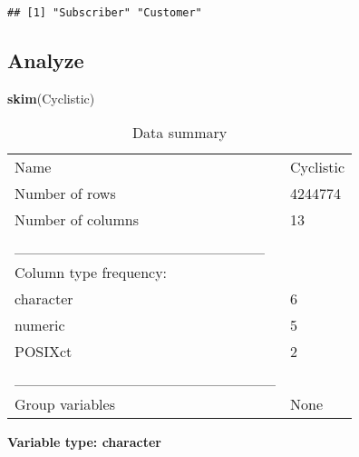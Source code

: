 \documentclass[
]{article}
\newenvironment{Shaded}{\begin{snugshade}}{\end{snugshade}}
\newcommand{\FunctionTok}[1]{\textcolor[rgb]{0.13,0.29,0.53}{\textbf{#1}}}
\newcommand{\NormalTok}[1]{#1}
\newcommand{\SpecialCharTok}[1]{\textcolor[rgb]{0.81,0.36,0.00}{\textbf{#1}}}
\begin{document}
\begin{Shaded}
\end{Shaded}

\begin{verbatim}
## [1] "Subscriber" "Customer"
\end{verbatim}

\hypertarget{analyze}{%
\subsection{Analyze}\label{analyze}}

\begin{Shaded}
\begin{Highlighting}[]
\FunctionTok{skim}\NormalTok{(Cyclistic)}
\end{Highlighting}
\end{Shaded}

\begin{longtable}[]{@{}ll@{}}
\caption{Data summary}\tabularnewline
\toprule\noalign{}
\endfirsthead
\endhead
\bottomrule\noalign{}
\endlastfoot
Name & Cyclistic \\
Number of rows & 4244774 \\
Number of columns & 13 \\
\_\_\_\_\_\_\_\_\_\_\_\_\_\_\_\_\_\_\_\_\_\_\_ & \\
Column type frequency: & \\
character & 6 \\
numeric & 5 \\
POSIXct & 2 \\
\_\_\_\_\_\_\_\_\_\_\_\_\_\_\_\_\_\_\_\_\_\_\_\_ & \\
Group variables & None \\
\end{longtable}

\textbf{Variable type: character}
\end{document}
